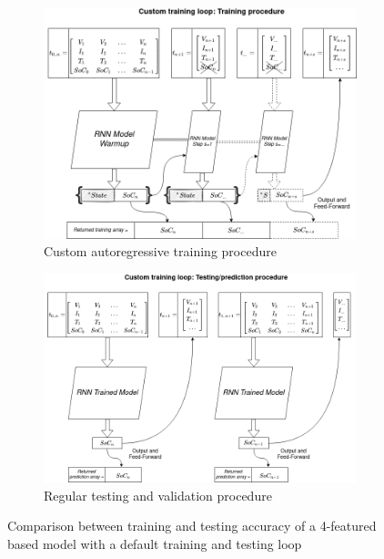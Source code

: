 \begin{figure}[htbp]
    \centering
    \begin{subfigure}[b]{0.85\textwidth}
        \centering
        \includegraphics[width=\linewidth]{II_Body/images/Autoregression-Training.png}
        \caption{Custom autoregressive training procedure}
        \label{subfig:testing}
    \end{subfigure}
    \hfill
    \begin{subfigure}[b]{0.85\textwidth}
        \centering
        \includegraphics[width=\linewidth]{II_Body/images/Autoregression-Testing.png}
        \caption{Regular testing and validation procedure}
        \label{subfig:training}
    \end{subfigure}
    \caption{Comparison between training and testing accuracy of a 4-featured based model with a default training and testing loop}
    \label{fig:training_testing}
\end{figure}

